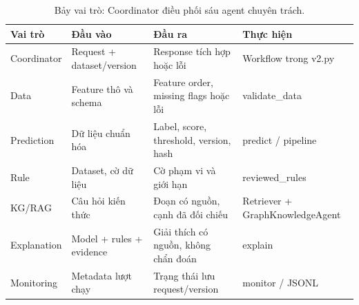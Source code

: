\par\FloatBarrier\begin{table}[H]\centering\small{}\setlength{\tabcolsep}{5pt}
\caption{Bảy vai trò: Coordinator điều phối sáu agent chuyên trách.}\begin{tabular}{P{2.2cm}P{4.1cm}P{4.1cm}P{3.1cm}}\toprule
Vai trò & Đầu vào & Đầu ra & Thực hiện\\\midrule
Coordinator & Request + dataset/version & Response tích hợp hoặc lỗi & Workflow trong v2.py\\
Data & Feature thô và schema & Feature order, missing flags hoặc lỗi & validate\_data\\
Prediction & Dữ liệu chuẩn hóa & Label, score, threshold, version, hash & predict / pipeline\\
Rule & Dataset, cờ dữ liệu & Cờ phạm vi và giới hạn & reviewed\_rules\\
KG/RAG & Câu hỏi kiến thức & Đoạn có nguồn, cạnh đã đối chiếu & Retriever + GraphKnowledgeAgent\\
Explanation & Model + rules + evidence & Giải thích có nguồn, không chẩn đoán & explain\\
Monitoring & Metadata lượt chạy & Trạng thái lưu request/version & monitor / JSONL\\\bottomrule\end{tabular}\end{table}
